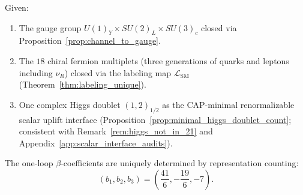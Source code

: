 \begin{proposition}\label{prop:beta_from_labeling}
\InterfaceTag
Given:
\begin{enumerate}
\item The gauge group $U(1)_Y\times SU(2)_L\times SU(3)_c$ closed via Proposition~\ref{prop:channel_to_gauge}.
\item The $18$ chiral fermion multiplets (three generations of quarks and leptons including $\nu_R$) closed via the labeling map $\mathcal{L}_{\mathrm{SM}}$ (Theorem~\ref{thm:labeling_unique}).
\item One complex Higgs doublet $(1,2)_{1/2}$ as the CAP-minimal renormalizable scalar uplift interface (Proposition~\ref{prop:minimal_higgs_doublet_count}; consistent with Remark~\ref{rem:higgs_not_in_21} and Appendix~\ref{app:scalar_interface_audits}).
\end{enumerate}
The one-loop $\beta$-coefficients are uniquely determined by representation counting:
\begin{equation}\label{eq:beta_sm_values}
(b_1, b_2, b_3) = \left(\frac{41}{6}, -\frac{19}{6}, -7\right).
\end{equation}
\end{proposition}
